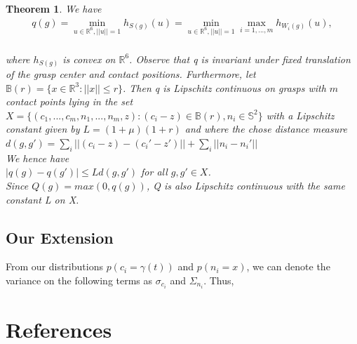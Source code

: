 \documentclass[letterpaper, 10 pt, conference]{ieeeconf}  %
\newtheorem{theorem}{Theorem}
\begin{document}
\begin{theorem}
We have \\

\begin{align}
q(g) = \min_{u\in \mathbb{R}^6, ||u|| =1} h_{S(g)}(u) = \min_{u\in \mathbb{R}^6, ||u|| =1} \max_{i=1,...,m} h_{W_i(g)}(u),\\
\end{align}

where $h_{S(g)}$ is convex on $\mathbb{R}^6$. Observe that q is invariant under fixed translation of the grasp center and contact positions. Furthermore, let $\mathbb{B}(r) = \lbrace x \in \mathbb{R}^3 : ||x|| \leq r \rbrace$. Then q is Lipschitz continuous on grasps with $m$ contact points lying in the set $X = \lbrace (c_1,...,c_m,n_1,...,n_m,z) : (c_i-z) \in \mathbb{B}(r), n_i \in \mathbb{S}^2 \rbrace$ with a Lipschitz constant given by $L= (1+\mu)(1+r)$ and where the chose distance measure \\

$d(g,g') = \sum_i ||(c_i-z)-(c_i'-z')|| + \sum_i ||n_i - n_i'||$\\

We hence have \\

$|q(g) - q(g')| \leq Ld(g,g')$ for all $g,g' \in X$. \\

Since $Q(g) = max(0,q(g))$, Q is also Lipschitz continuous with the same constant L on X. 
\end{theorem}

\subsection{Our Extension}
From our distributions $p(c_i=\gamma(t))$ and $p(n_i = x)$, we can denote the variance on the following terms as $\sigma_{c_i}$ and $\Sigma_{n_i}$. Thus, 

\section{References}



\end{document}
